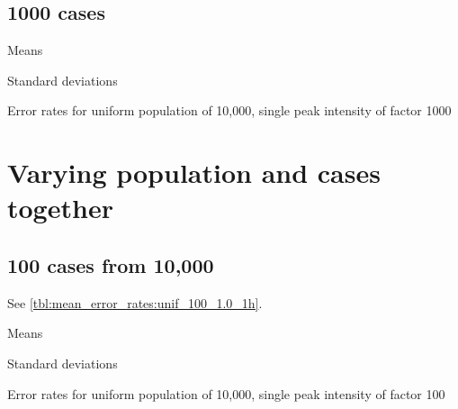 \subsection{1000 cases}
\begin{table}[H]
\centering
\scriptsize

    \begin{subtable}{0.5\textwidth}
    
    \caption[]{Means} 
    \end{subtable}%
    \begin{subtable}{0.5\textwidth}
    
    \caption[]{Standard deviations} 
    \end{subtable}

\caption[]{Error rates for uniform population of 10,000, single peak intensity of factor 1000}
\label{tbl:mean_error_rates:unif_1000_1.0_1h}
\end{table}


\section{Varying population and cases together}

\subsection{100 cases from 10,000}

See \autoref{tbl:mean_error_rates:unif_100_1.0_1h}.

\begin{table}[H]
\centering
\scriptsize

    \begin{subtable}{0.5\textwidth}
    
    \caption[]{Means} 
    \end{subtable}%
    \begin{subtable}{0.5\textwidth}
    
    \caption[]{Standard deviations} 
    \end{subtable}

\caption[]{Error rates for uniform population of 10,000, single peak intensity of factor 100}
\label{tbl:mean_error_rates:unif_100_1.0_1h:2}
\end{table}

